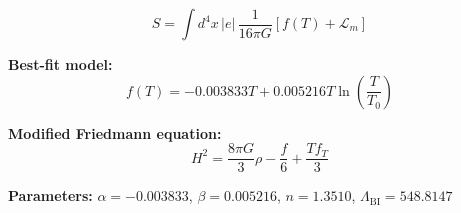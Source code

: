 
\begin{equation}
  S = \int d^4x \, |e| \, \frac{1}{16\pi G} \left[ f(T) + \mathcal{L}_m \right]
\end{equation}

\textbf{Best-fit model:}
\begin{equation}
  f(T) = -0.003833 T + 0.005216 T \ln\!\left(\frac{T}{T_0}\right)
\end{equation}

\textbf{Modified Friedmann equation:}
\begin{equation}
  H^2 = \frac{8\pi G}{3} \rho - \frac{f}{6} + \frac{T f_T}{3}
\end{equation}

\textbf{Parameters:}
$\alpha = -0.003833$, \quad
$\beta = 0.005216$, \quad
$n = 1.3510$, \quad
$\Lambda_{\text{BI}} = 548.8147$